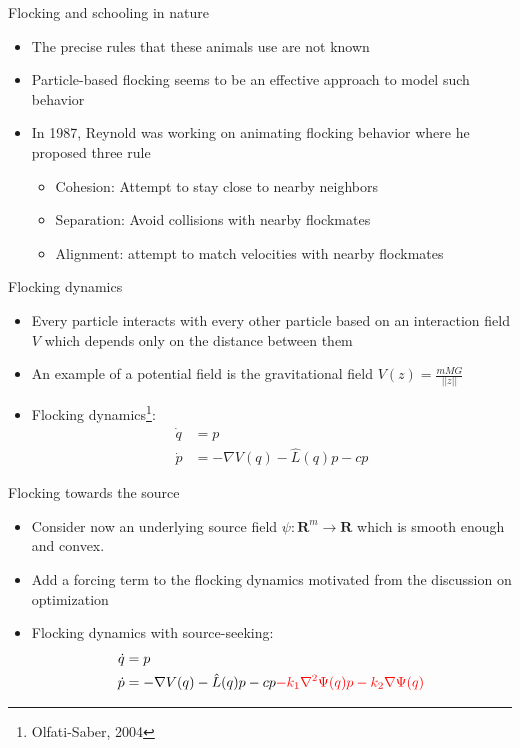 \begin{frame}{Flocking and schooling in nature}
\begin{minipage}{0.45\textwidth}
\end{minipage}
\begin{itemize}	
	\item The precise rules that these animals use are not known
	\item Particle-based flocking seems to be an effective approach to model such behavior
	\item In 1987, Reynold was working on animating flocking behavior where he proposed three rule
	\begin{itemize}
		\item Cohesion: Attempt to stay close to nearby neighbors
		\item Separation: Avoid collisions with nearby flockmates
		\item Alignment: attempt to match velocities with nearby flockmates
	\end{itemize}
\end{itemize}
\end{frame}
\begin{frame}{Flocking dynamics}
\begin{itemize}
	\item Every particle interacts with every other particle based on an interaction field $V$ which depends only on the distance between them
	\item An example of a potential field is the gravitational field $V(z)=\frac{mMG}{||z||}$
	\item Flocking dynamics\footnote{Olfati-Saber, 2004}:
	\begin{equation*}
	\begin{split}
	\Dot{q}&=p\\
	\Dot{p}&=-\nabla V(q)-\hat{L}(q)p -cp 
	\end{split}
	\end{equation*}
\end{itemize}
\end{frame}
\begin{frame}{Flocking towards the source}
\begin{itemize}
\item Consider now an underlying source field $\psi:\mathbf{R}^m \xrightarrow{} \mathbf{R}$ which is smooth enough and convex.
\item Add a forcing term to the flocking dynamics motivated from the discussion on optimization
\item Flocking dynamics with source-seeking:
\begin{equation*}
\begin{split}
\Dot{q}&=p\\
\Dot{p}&=-\nabla V(q)-\hat{L}(q)p -cp\textcolor{red}{-k_1\nabla^2 \Psi(q) p -k_2 \nabla \Psi(q)}
\end{split}
\end{equation*}
\end{itemize}
\end{frame}
